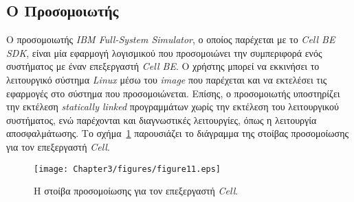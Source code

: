 \subsection[3.3.3 Ο Προσομοιωτής]{Ο Προσομοιωτής}
\label{subsection:sub333}
\indent
Ο προσομοιωτής \textsl{IBM Full-System Simulator}, ο οποίος παρέχεται με το \textsl{Cell BE SDK}, είναι μία εφαρμογή λογισμικού που προσομοιώνει την συμπεριφορά ενός συστήματος με έναν επεξεργαστή \textsl{Cell BE}. Ο χρήστης μπορεί να εκκινήσει το λειτουργικό σύστημα \textsl{Linux} μέσω του \textsl{image} που παρέχεται και να εκτελέσει τις εφαρμογές στο σύστημα που προσομοιώνεται. Επίσης, ο προσομοιωτής υποστηρίζει την εκτέλεση \textsl{statically linked} προγραμμάτων χωρίς την εκτέλεση του λειτουργικού συστήματος, ενώ παρέχονται και διαγνωστικές λειτουργίες, όπως η λειτουργία αποσφαλμάτωσης. Το σχήμα~\ref{figure:fig311} παρουσιάζει το διάγραμμα της στοίβας προσομοίωσης για τον επεξεργαστή \textsl{Cell}.

\begin{figure}
\centering
\texttt{[image: Chapter3/figures/figure11.eps]}
\caption{Η στοίβα προσομοίωσης για τον επεξεργαστή \textsl{Cell}.}
\label{figure:fig311}
\end{figure}

